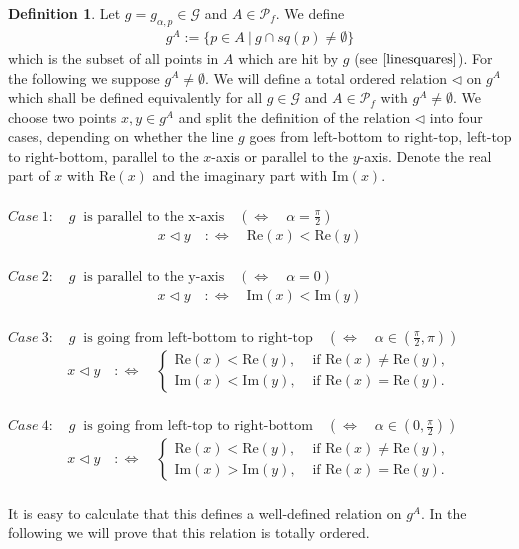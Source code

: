 \documentclass[12pt,a4paper]{scrartcl}
\newcommand{\1}{\mathbbm{1}}
\newcommand{\G}{\mathcal{G}}
\newcommand{\mP}{\mathcal{P}}
\newcommand{\re}{\text{Re}}
\newcommand{\im}{\text{Im}}
\theoremstyle{definition}
\newtheorem{definition}{Definition}[subsection]
\numberwithin{equation}{section}
\begin{document}
\begin{definition} \label{ghitA}
	Let $g=g_{\alpha,p}\in \G$ and $A\in \mP_f$. We define
	\begin{align*}
		g^A := \{ p\in A\ |\ g \cap sq(p)\neq \emptyset\}
	\end{align*}
	which is the subset of all points in $A$ which are hit by $g$ (see $\autoref{linesquares}$). For the following we suppose $g^A \neq \emptyset$. We will define a total ordered relation $\triangleleft$ on $g^A$ which shall be defined equivalently for all $g\in \G$ and $A\in\mP_f$ with $g^A \neq\emptyset$. We choose two points $x,y\in g^A$ and split the definition of the relation $\triangleleft$ into four cases, depending on whether the line $g$ goes from left-bottom to right-top, left-top to right-bottom, parallel to the $x$-axis or parallel to the $y$-axis. Denote the real part of $x$ with $\re(x)$ and the imaginary part with $\im(x)$. \\
	\\
	$\mathit{Case}\ 1:\quad g\ \text{ is parallel to the x-axis}\quad (\Leftrightarrow\quad \alpha = \frac{\pi}{2})$
	\begin{align*}
	x \triangleleft y \quad :\Leftrightarrow \quad \re(x) < \re(y)
	\end{align*}\\
	$\mathit{Case}\ 2:\quad g\ \text{ is parallel to the y-axis}\quad (\Leftrightarrow\quad \alpha = 0)$
	\begin{align*}
	x \triangleleft y \quad :\Leftrightarrow \quad \im(x) < \im(y)
	\end{align*}\\
	$\mathit{Case}\ 3:\quad g\ \text{ is going from left-bottom to right-top}\quad (\Leftrightarrow\quad \alpha\in (\frac{\pi}{2},\pi))$
	\begin{align*}
	x \triangleleft y \quad :\Leftrightarrow \quad
		\begin{cases}
			\re(x) < \re(y), & \text{ if } \re(x) \neq \re(y), \\
			\im(x) < \im(y), & \text{ if } \re(x) = \re(y).
		\end{cases}
	\end{align*}\\
	$\mathit{Case}\ 4:\quad g\ \text{ is going from left-top to right-bottom}\quad (\Leftrightarrow\quad \alpha\in (0,\frac{\pi}{2}))$
	\begin{align*}
	x \triangleleft y \quad :\Leftrightarrow \quad
	\begin{cases}
	\re(x) < \re(y), & \text{ if } \re(x) \neq \re(y), \\
	\im(x) > \im(y), & \text{ if } \re(x) = \re(y).
	\end{cases}
	\end{align*}\\
	It is easy to calculate that this defines a well-defined relation on $g^A$. In the following we will prove that this relation is totally ordered. 
\end{definition}
\end{document}
